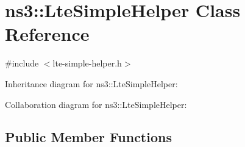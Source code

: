 \hypertarget{classns3_1_1LteSimpleHelper}{}\section{ns3\+:\+:Lte\+Simple\+Helper Class Reference}
\label{classns3_1_1LteSimpleHelper}


{\ttfamily \#include $<$lte-\/simple-\/helper.\+h$>$}



Inheritance diagram for ns3\+:\+:Lte\+Simple\+Helper\+:


Collaboration diagram for ns3\+:\+:Lte\+Simple\+Helper\+:
\subsection*{Public Member Functions}
